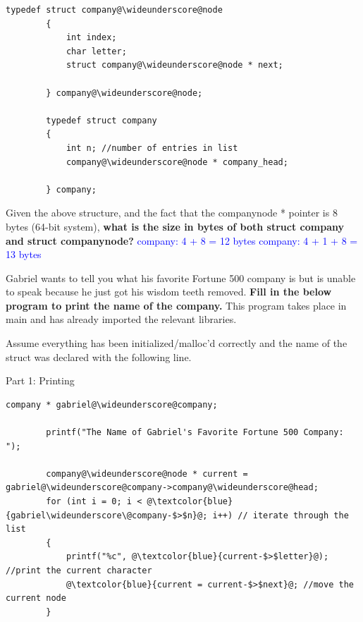 \documentclass{article}
\newcommand{\wideunderscore}{\underline{\hphantom{n}}}
\begin{document}
\begin{enumerate}[label=(\alph*)]
    \begin{lstlisting}[style = CStyle]
        typedef struct company@\wideunderscore@node
        {
            int index;
            char letter;
            struct company@\wideunderscore@node * next;
            
        } company@\wideunderscore@node;

        typedef struct company
        {
            int n; //number of entries in list
            company@\wideunderscore@node * company_head;
            
        } company;
    \end{lstlisting}

    Given the above structure, and the fact that the company\wideunderscore node * pointer is 8 bytes (64-bit system),
    \textbf{what is the size in bytes of both struct company and struct company\wideunderscore node?}
    \newline\textcolor{blue}{company: 4 + 8 = 12 bytes}
    \newline\textcolor{blue}{company\@\wideunderscore\@node: 4 + 1 + 8 = 13 bytes}

    \vspace{2.5cm} %
    
    Gabriel wants to tell you what his favorite Fortune 500 company is but is unable to speak because he just got his wisdom teeth removed. \textbf{Fill in the below program to print the name of the company.} This program takes place in main and has already imported the relevant libraries. 

    Assume everything has been initialized/malloc'd correctly and the name of the struct was declared with the following line. 

    Part 1: Printing

    \begin{lstlisting}[style = CStyle]
        company * gabriel@\wideunderscore@company;

        printf("The Name of Gabriel's Favorite Fortune 500 Company: ");

        company@\wideunderscore@node * current = gabriel@\wideunderscore@company->company@\wideunderscore@head;
        for (int i = 0; i < @\textcolor{blue}{gabriel\wideunderscore\@company-$>$n}@; i++) // iterate through the list
        { 
            printf("%c", @\textcolor{blue}{current-$>$letter}@); //print the current character
            @\textcolor{blue}{current = current-$>$next}@; //move the current node
        }
    \end{lstlisting}
    

\end{enumerate}
\end{document}

